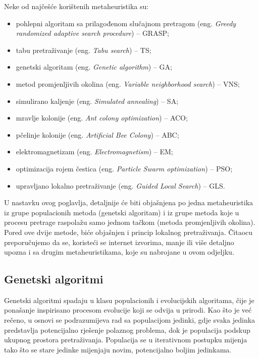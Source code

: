 \documentclass[a4paper, utf8, 11pt, colorlinks]{book}
\theoremstyle{definition}
\begin{document}
 Neke od najčešće korištenih metaheuristika su:
 \begin{itemize}
 	\item pohlepni algoritam sa prilagođenom slučajnom pretragom (eng. \emph{Greedy randomized adaptive search procedure}) -- GRASP;
 	\item tabu pretraživanje (eng. \emph{Tabu search}) -- TS;
 	\item genetski algoritam (eng. \emph{Genetic algorithm}) -- GA;
 	\item metod promjenljivih okolina (eng. \emph{Variable neighborhood search}) -- VNS;
 	\item simulirano kaljenje (eng. \emph{Simulated annealing}) -- SA;
 	\item mravlje kolonije (eng. \emph{Ant colony optimization}) -- ACO;
 	\item pčelinje kolonije (eng. \emph{Artificial Bee Colony}) -- ABC;
 	\item elektromagnetizam (eng. \emph{Electromagnetism}) -- EM;
 	\item optimizacija rojem čestica (eng. \emph{Particle Swarm optimization}) -- PSO;
 	\item upravljano lokalno pretraživanje (eng. \emph{Guided Local Search})  -- GLS.
 \end{itemize}

U nastavku ovog poglavlja, detaljnije će biti objašnjena po jedna metaheuristika iz grupe populacionih metoda (genetski algoritam) i iz grupe metoda koje u procesu pretrage raspolažu samo jednom tačkom (metoda promjenljivih okolina). Pored ove dvije metode, biće objašnjen i princip lokalnog pretraživanja. Čitaocu preporučujemo da se, koristeći se internet izvorima, manje ili više detaljno upozna i sa drugim metaheuristikama, koje su nabrojane u ovom odjeljku.


\subsection{Genetski algoritmi}\label{intro:ga}


Genetski algoritmi spadaju u klasu populacionih i evolucijskih algoritama, čije je ponašanje inspirisano procesom evolucije koji se odvija u prirodi.
Kao što je već rečeno, u osnovi se podrazumijeva rad sa populacijom jedinki, gdje svaka jedinka predstavlja potencijalno rješenje polaznog problema, dok je populacija  podskup ukupnog prostora pretraživanja. Populacija se u iterativnom postupku mijenja tako što se stare jedinke mijenjaju novim, potencijalno boljim jedinkama.
\end{document}
